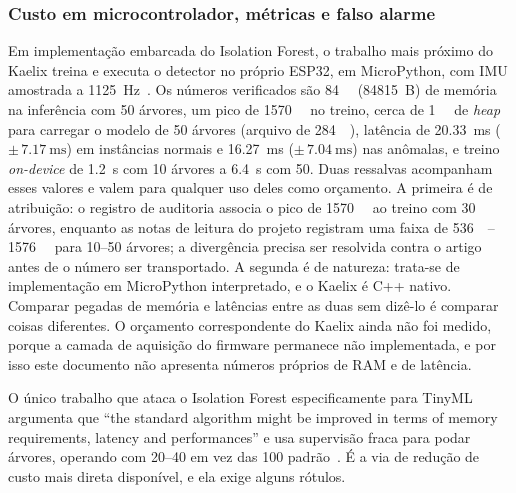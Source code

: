 \documentclass[11pt,a4paper]{article}
\begin{document}
\subsubsection{Custo em microcontrolador, métricas e falso alarme}

Em implementação embarcada do Isolation Forest, o trabalho mais próximo do Kaelix treina e
executa o detector no próprio ESP32, em MicroPython, com IMU amostrada a
\SI{1125}{\hertz}~\cite{antonini2023}. Os números verificados são \SI{84}{\kilo\byte}
(\num{84815}~B) de memória na inferência com \num{50} árvores, um pico de
\SI{1570}{\kilo\byte} no treino, cerca de \SI{1}{\mega\byte} de \emph{heap} para carregar
o modelo de \num{50} árvores (arquivo de \SI{284}{\kilo\byte}), latência de
\SI{20,33}{\milli\second} ($\pm\,\SI{7,17}{\milli\second}$) em instâncias normais e
\SI{16,27}{\milli\second} ($\pm\,\SI{7,04}{\milli\second}$) nas anômalas, e treino
\emph{on-device} de \SI{1,2}{\second} com \num{10} árvores a \SI{6,4}{\second} com
\num{50}. Duas ressalvas acompanham esses valores e valem para qualquer uso deles como
orçamento. A primeira é de atribuição: o registro de auditoria associa o pico de
\SI{1570}{\kilo\byte} ao treino com \num{30} árvores, enquanto as notas de leitura do
projeto registram uma faixa de \SIrange{536}{1576}{\kilo\byte} para \numrange{10}{50}
árvores; a divergência precisa ser resolvida contra o artigo antes de o número ser
transportado. A segunda é de natureza: trata-se de implementação em MicroPython
interpretado, e o Kaelix é C++ nativo. Comparar pegadas de memória e latências entre as
duas sem dizê-lo é comparar coisas diferentes. O orçamento correspondente do Kaelix ainda
não foi medido, porque a camada de aquisição do firmware permanece não implementada, e
por isso este documento não apresenta números próprios de RAM e de latência.

O único trabalho que ataca o Isolation Forest especificamente para TinyML argumenta que
``the standard algorithm might be improved in terms of memory requirements, latency and
performances'' e usa supervisão fraca para podar árvores, operando com \numrange{20}{40}
em vez das \num{100} padrão~\cite{barbariol2022}. É a via de redução de custo mais direta
disponível, e ela exige alguns rótulos.
\end{document}
